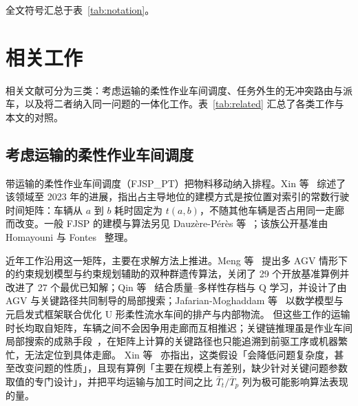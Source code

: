 \documentclass[manuscript,screen,review]{acmart}
\begin{document}
全文符号汇总于表~\ref{tab:notation}。



\section{相关工作}
\label{sec:Chapter_II}

相关文献可分为三类：考虑运输的柔性作业车间调度、任务外生的无冲突路由与派车，以及将二者纳入同一问题的一体化工作。表~\ref{tab:related} 汇总了各类工作与本文的对照。

\subsection{考虑运输的柔性作业车间调度}

带运输的柔性作业车间调度（FJSP\_PT）把物料移动纳入排程。Xin 等~\cite{xin2025review} 综述了该领域至 2023 年的进展，指出占主导地位的建模方式是按位置对索引的常数行驶时间矩阵：车辆从 $a$ 到 $b$ 耗时固定为 $t(a,b)$，不随其他车辆是否占用同一走廊而改变。一般 FJSP 的建模与算法另见 Dauz\`ere-P\'er\`es 等~\cite{dauzereperes2024fjsp}；该族公开基准由 Homayouni 与 Fontes~\cite{homayouni2021production} 整理。

近年工作沿用这一矩阵，主要在求解方法上推进。Meng 等~\cite{meng2025cp} 提出多 AGV 情形下的约束规划模型与约束规划辅助的双种群遗传算法，关闭了 29 个开放基准算例并改进了 27 个最优已知解；Qin 等~\cite{qin2026knowledge} 结合质量--多样性存档与 Q 学习，并设计了由 AGV 与关键路径共同制导的局部搜索；Jafarian-Moghaddam 等~\cite{jafarian2026integrated} 以数学模型与元启发式框架联合优化 U 形柔性流水车间的排产与内部物流。
但这些工作的运输时长均取自矩阵，车辆之间不会因争用走廊而互相推迟；关键链推理虽是作业车间局部搜索的成熟手段~\cite{otala2021graph,tamssaouet2023neighborhood}，在矩阵上计算的关键路径也只能追溯到前驱工序或机器繁忙，无法定位到具体走廊。
Xin 等~\cite{xin2025review} 亦指出，这类假设「会降低问题复杂度，甚至改变问题的性质」，且现有算例「主要在规模上有差别，缺少针对关键问题参数取值的专门设计」，并把平均运输与加工时间之比 $\bar{T}_t/\bar{T}_p$ 列为极可能影响算法表现的量。
\end{document}

